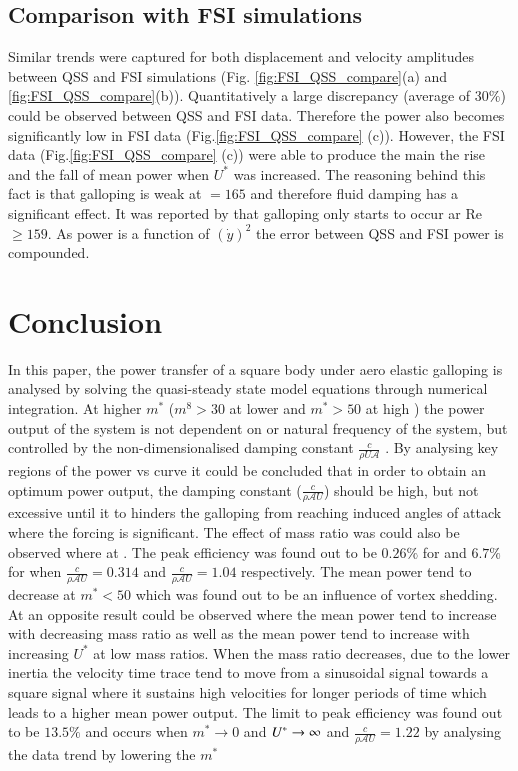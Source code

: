 \subsection{Comparison with FSI simulations}
 Similar trends were captured for both displacement and velocity amplitudes between QSS and FSI simulations (Fig. \ref{fig:FSI_QSS_compare}(a) and \ref{fig:FSI_QSS_compare}(b)). Quantitatively a large discrepancy (average of $30\%$) could be observed between QSS and FSI data. Therefore the power also becomes significantly low in FSI data (Fig.\ref{fig:FSI_QSS_compare} (c)). However, the FSI data (Fig.\ref{fig:FSI_QSS_compare} (c)) were able to produce the main the rise and the fall of mean power when $U^*$ was increased. The reasoning behind this fact is that galloping is weak at \reynoldsnumber$=165$  and therefore fluid damping has a significant effect. It was reported by \cite{Barrero-Gil2009} that galloping only starts to occur ar Re $\geq 159$. As power is a function of $(\dot{y})^2$ the error between QSS and FSI power is compounded.  
 

 

\section{Conclusion}
\label{sec:conc}

In this paper, the power transfer of a square body under aero elastic galloping is analysed by solving the quasi-steady state model equations through numerical integration. At higher $m^*$ ($m^8>30$ at lower \reynoldsnumber and $m^*> 50$ at high \reynoldsnumber) the power output of the system is not dependent on \ustar or natural frequency of the system, but controlled by the non-dimensionalised damping constant $\frac{c}{\rho U \mathcal{A}}$ . By analysing key regions of the power vs \ustar curve it could be concluded that in order to obtain an optimum power output, the damping constant ($\frac{c}{\rho\mathcal{A}U}$) should be high, but not excessive until it  to hinders the galloping from reaching induced angles of attack where the forcing is significant. The effect of mass ratio was could also be observed where at . The peak efficiency was found out to be $0.26\%$ for  and $6.7\%$ for   when $\frac{c}{\rho \mathcal{A}U}=0.314$ and $\frac{c}{\rho \mathcal{A}U}=1.04$ respectively. The mean power tend to decrease at $m^*<50$ which was found out to be an influence of vortex shedding. At  an opposite result could be observed where the mean power tend to increase with decreasing mass ratio as well as the mean power tend to increase with increasing $U^*$ at low mass ratios. When the mass ratio decreases, due to the lower inertia the velocity time trace tend to move from a sinusoidal signal towards a square signal where it sustains high velocities for longer periods of time which leads to a higher mean power output. The limit to peak efficiency was found out to be $13.5\%$ and occurs when $m^*\rightarrow 0$ and $U^{*} \rightarrow \infty$ and $\frac{c}{\rho \mathcal{A}U}=1.22$ by analysing the data trend by lowering the $m^*$






